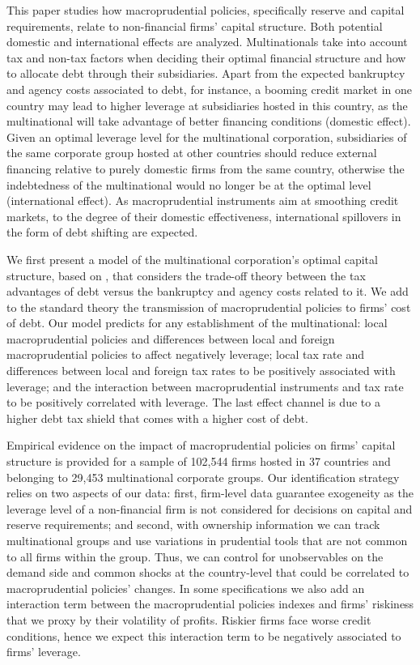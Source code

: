 \documentclass[12pt]{article}
\begin{document}
	This paper studies how macroprudential policies, specifically reserve and capital requirements, relate to non-financial firms' capital structure. Both potential domestic and international effects are analyzed. Multinationals take into account tax and non-tax factors when deciding their optimal financial structure and how to allocate debt through their subsidiaries. Apart from the expected bankruptcy and agency costs associated to debt, for instance, a booming credit market in one country may lead to higher leverage at subsidiaries hosted in this country, as the multinational will take advantage of better financing conditions (domestic effect). Given an optimal leverage level for the multinational corporation, subsidiaries of the same corporate group hosted at other countries should reduce external financing relative to purely domestic firms from the same country, otherwise the indebtedness of the multinational would no longer be at the optimal level (international effect). As macroprudential instruments aim at smoothing credit markets, to the degree of their domestic effectiveness, international spillovers in the form of debt shifting are expected. 
	
	We first present a model of the multinational corporation's optimal capital structure, based on \cite*{huizinga2008capital}, that considers the trade-off theory between the tax advantages of debt versus the bankruptcy and agency costs related to it. We add to the standard theory the transmission of macroprudential policies to firms' cost of debt. Our model predicts for any establishment of the multinational: local macroprudential policies and differences between local and foreign macroprudential policies to affect negatively leverage; local tax rate and differences between local and foreign tax rates to be positively associated with leverage; and the interaction between macroprudential instruments and tax rate to be positively correlated with leverage. The last effect channel is due to a higher debt tax shield that comes with a higher cost of debt.
	
	Empirical evidence on the impact of macroprudential policies on firms' capital structure is provided for a sample of 102,544 firms hosted in 37 countries and belonging to 29,453 multinational corporate groups. Our identification strategy relies on two aspects of our data: first, firm-level data guarantee exogeneity as the leverage level of a non-financial firm is not considered for decisions on capital and reserve requirements; and second, with ownership information we can track multinational groups and use variations in prudential tools that are not common to all firms within the group. Thus, we can control for unobservables on the demand side and common shocks at the country-level that could be correlated to macroprudential policies' changes. In some specifications we also add an interaction term between the macroprudential policies indexes and firms' riskiness that we proxy by their volatility of profits. Riskier firms face worse credit conditions, hence  we expect this interaction term to be negatively associated to firms' leverage.
	
\end{document}
